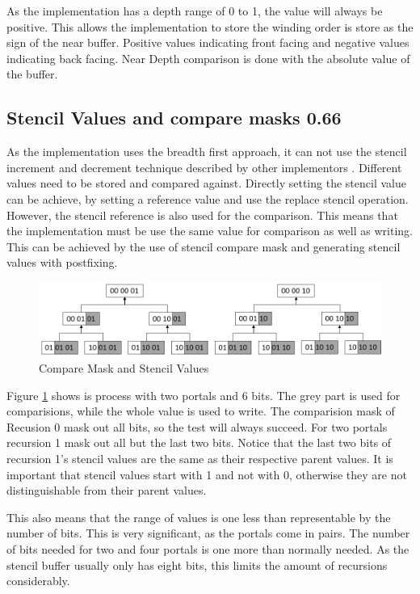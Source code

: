As the implementation has a depth range of 0 to 1, the value will always be positive. This allows the implementation to store the winding order is store as the sign of the near buffer. Positive values indicating front facing and negative values indicating back facing. Near Depth comparison is done with the absolute value of the buffer.

\subsection{Stencil Values and compare masks 0.66}
\label{section:stencilcomparemasks}

As the implementation uses the breadth first approach, it can not use the stencil increment and decrement technique described by other implementors \cite{schmalstieg:1999:sewing, lowe:2003:fragment, lecture:portalProblems}. Different values need to be stored and compared against. Directly setting the stencil value can be achieve, by setting a reference value and use the replace stencil operation. However, the stencil reference is also used for the comparison. This means that the implementation must be use the same value for comparison as well as writing. This can be achieved by the use of stencil compare mask and generating stencil values with postfixing.

\begin{figure}[h]
	\includegraphics[width=\linewidth]{images/stencilvalues2.png}
	\caption{Compare Mask and Stencil Values}
	\label{fig:stencilvalues}
\end{figure}

Figure \ref{fig:stencilvalues} shows is process with two portals and 6 bits. The grey part is used for comparisions, while the whole value is used to write. The comparision mask of Recusion 0 mask out all bits, so the test will always succeed. For two portals recursion 1 mask out all but the last two bits. Notice that the last two bits of  recursion 1's stencil values are the same as their respective parent values. It is important that stencil values start with 1 and not with 0, otherwise they are not distinguishable from their parent values.

This also means that the range of values is one less than representable by the number of bits. This is very significant, as the portals come in pairs. The number of bits needed for two and four portals is one more than normally needed. As the stencil buffer usually only has eight bits, this limits the amount of recursions considerably.

